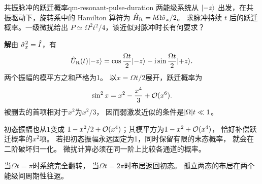 \begin{example}{共振脉冲的跃迁概率}{qm-resonant-pulse-duration}
    两能级系统从 $\lvert-z\rangle$ 出发，在共振驱动下，旋转系中的 Hamilton 算符为 $\hat{H}_{\mathrm{R}} = \hbar\Omega\hat{\sigma}_x/2$。
    求脉冲持续 $t$ 后的跃迁概率。一级微扰给出 $P \simeq \Omega^2t^2/4$，该近似对脉冲时长有何要求？

    \par\smallskip\textbf{解}\quad 由 $\hat{\sigma}_x^2 = \hat{I}$，有
    \begin{equation}
        \hat{U}_{\mathrm{R}}(t)\lvert-z\rangle
        = \cos\frac{\Omega t}{2}\lvert-z\rangle
            - \mathrm{i}\sin\frac{\Omega t}{2}\lvert+z\rangle.
    \end{equation}
    两个振幅的模平方之和严格为1。
    以$x = \Omega t/2$展开，跃迁概率为
    \[
        \sin^2x = x^2 - \frac{x^4}{3} + \mathcal{O}(x^6).
    \]
    被删去的首项相对于$x^2$为$x^2/3$，
    因而弱激发近似的条件是$\lvert\Omega\rvert t \ll 1$。

    初态振幅也从$1$变成
    $1 - x^2/2 + \mathcal{O}(x^4)$；其模平方为$1 - x^2 + \mathcal{O}(x^4)$，
    恰好补偿跃迁概率的$x^2$项。
    若把初态振幅永远固定为1，同时保留有限的末态概率，
    就会在二阶破坏归一化。
    微扰计算必须在同一阶上比较各通道的概率。

    当$\Omega t = \pi$时系统完全翻转，
    当$\Omega t = 2\pi$时布居返回初态。
    孤立两态的布居在两个能级间周期性往返。
\end{example}

